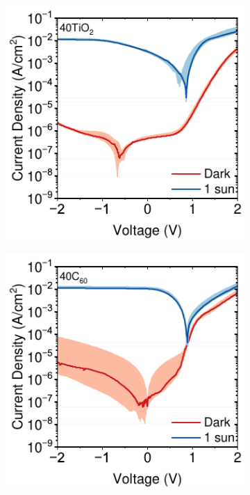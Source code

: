 \begin{figure}[!ht]
    \centering

    \begin{subfigure}[b]{0.32\textwidth}
        \centering
        \includegraphics[width=\textwidth]{chapters/transport_layers/images/JV_Median_40TiO2.pdf}
        \caption{}
    \end{subfigure}
    \hfill
    \begin{subfigure}[b]{0.32\textwidth}
        \centering
        \includegraphics[width=\textwidth]{chapters/transport_layers/images/JV_Median_40C60.pdf}

\end{subfigure}
\end{figure}
